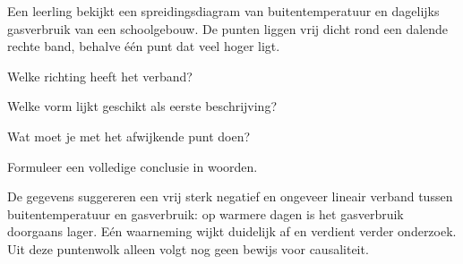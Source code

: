 \documentclass{ximera}
\begin{document}
\begin{oefening}{\oefU \ESS}

Een leerling bekijkt een spreidingsdiagram van buitentemperatuur en
dagelijks gasverbruik van een schoolgebouw. De punten liggen vrij dicht
rond een dalende rechte band, behalve één punt dat veel hoger ligt.

\begin{question}
Welke richting heeft het verband?

\begin{multipleChoice}
\end{multipleChoice}
\end{question}

\begin{question}
Welke vorm lijkt geschikt als eerste beschrijving?

\begin{multipleChoice}
\end{multipleChoice}
\end{question}

\begin{question}
Wat moet je met het afwijkende punt doen?

\begin{multipleChoice}
\end{multipleChoice}
\end{question}

\begin{question}
Formuleer een volledige conclusie in woorden.

\begin{oplossing}
De gegevens suggereren een vrij sterk negatief en ongeveer lineair
verband tussen buitentemperatuur en gasverbruik: op warmere dagen is
het gasverbruik doorgaans lager. Eén waarneming wijkt duidelijk af en
verdient verder onderzoek. Uit deze puntenwolk alleen volgt nog geen
bewijs voor causaliteit.
\end{oplossing}
\end{question}
\end{oefening}
\end{document}
